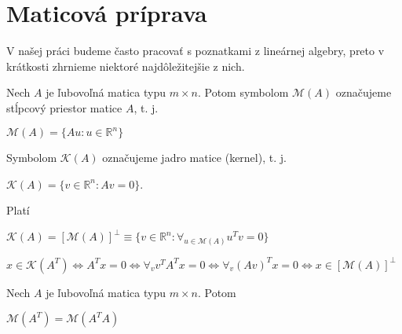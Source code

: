 \section{Maticová príprava}
\label{matrix algebra}

V našej práci budeme často pracovať s poznatkami z lineárnej algebry, preto v krátkosti zhrnieme niektoré najdôležitejšie z nich.

\begin{defin}
Nech $A$ je ľubovoľná matica typu $m \times n$. Potom symbolom $\mathcal{M}(A)$ označujeme stĺpcový priestor matice $A$, t. j.
\begin{center}
$
\mathcal{M}(A) = \{ Au : u \in \mathbb{R}^n \}
$
\end{center}
Symbolom $\mathcal{K}(A)$ označujeme jadro matice (kernel), t. j.
\begin{center}
$
\mathcal{K}(A) = \{ v \in \mathbb{R}^n : Av = 0 \}
$.
\end{center}
\end{defin}

\begin{lema}
Platí
\begin{center}
$
\mathcal{K}(A) = [\mathcal{M}(A)]^{\perp} \equiv \{ v \in \mathbb{R}^n : {\forall}_{u \in \mathcal{M}(A)} u^T v = 0 \}
$
\end{center}
\end{lema}

\begin{dokaz}


\begin{center}
$
x \in \mathcal{K}(A^T) \Leftrightarrow A^T x = 0 \Leftrightarrow {\forall}_v v^T A^T x = 0 \Leftrightarrow {\forall}_v (Av)^Tx = 0 \Leftrightarrow x \in [\mathcal{M}(A)]^{\perp}
$
\end{center}
\end{dokaz}

\begin{lema}
\label{o stlpcovych priestoroch}
Nech $A$ je ľubovoľná matica typu $m \times n$. Potom
\begin{center}
$\mathcal{M}(A^T) = \mathcal{M}(A^T A)$
\end{center}
\end{lema}

